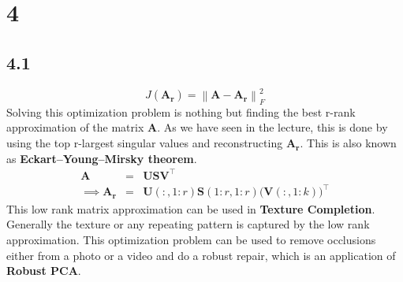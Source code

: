 \documentclass[12pt]{article}
\newcommand{\norm}[1]{\left\lVert #1 \right\rVert}
\begin{document}
\section*{4}
\subsection*{4.1}
$$J(\boldsymbol{A_r}) = \norm{\boldsymbol{A} - \boldsymbol{A_r}}_F^2$$
Solving this optimization problem is nothing but finding the best r-rank approximation of the matrix $\boldsymbol{A}$.  As we have seen in the lecture, this is done by using the top r-largest singular values and reconstructing $\boldsymbol{A_r}$. This is also known as \textbf{Eckart–Young–Mirsky theorem}. 
\begin{eqnarray*}
	\boldsymbol{A} &=& \boldsymbol{U} \boldsymbol{S} \boldsymbol{V}^\intercal \\
	\implies \boldsymbol{A_r} &=& \boldsymbol{U}(:,1:r) \boldsymbol{S}(1:r,1:r)\bigg(\boldsymbol{V}(:,1:k) \bigg)^\intercal
\end{eqnarray*}
\newline
This low rank matrix approximation can be used in \textbf{Texture Completion}. Generally the texture or any repeating pattern is captured by the low rank approximation. This optimization problem can be used to remove occlusions either from a photo or a video and do a robust repair, which is an application of \textbf{Robust PCA}.
\end{document}
